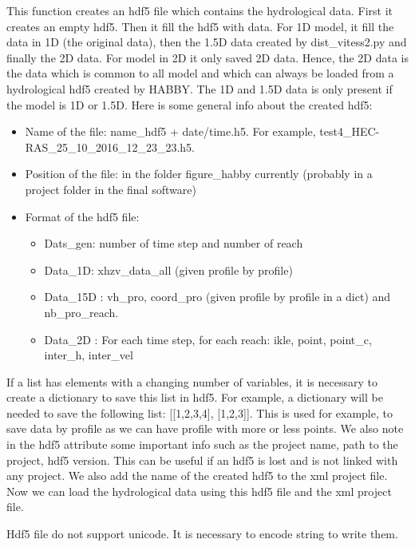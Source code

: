 \documentclass[letterpaper,10pt,english]{sphinxmanual}
\begin{document}
\begin{fulllineitems}
This function creates an hdf5 file which contains the hydrological data. First it creates an empty hdf5.
Then it fill the hdf5 with data. For 1D model, it fill the data in 1D (the original data), then the 1.5D data
created by dist\_vitess2.py and finally the 2D data. For model in 2D it only saved 2D data. Hence, the 2D data
is the data which is common to all model and which can always be loaded from a hydrological hdf5 created by
HABBY. The 1D and 1.5D data is only present if the model is 1D or 1.5D. Here is some general info about the
created hdf5:
\begin{itemize}
\item {} 
Name of the file: name\_hdf5  + date/time.h5.  For example, test4\_HEC-RAS\_25\_10\_2016\_12\_23\_23.h5.

\item {} 
Position of the file: in the folder  figure\_habby currently (probably in a project folder in the final software)

\item {} 
Format of the hdf5 file:
\begin{itemize}
\item {} 
Dats\_gen:  number of time step and number of reach

\item {} 
Data\_1D:  xhzv\_data\_all (given profile by profile)

\item {} 
Data\_15D :  vh\_pro, coord\_pro (given profile by profile in a dict) and nb\_pro\_reach.

\item {} 
Data\_2D : For each time step, for each reach: ikle, point, point\_c, inter\_h, inter\_vel

\end{itemize}

\end{itemize}

If a list has elements with a changing number of variables, it is necessary to create a dictionary to save
this list in hdf5. For example, a dictionary will be needed to save the following list: {[}{[}1,2,3,4{]}, {[}1,2,3{]}{]}.
This is used for example, to save data by profile as we can have profile with more or less points. We also note
in the hdf5 attribute some important info such as the project name, path to the project, hdf5 version.
This can be useful if an hdf5 is lost and is not linked with any project. We also add the name of the created
hdf5 to the xml project file. Now we can load the hydrological data using this hdf5 file and the xml project file.

Hdf5 file do not support unicode. It is necessary to encode string to write them.

\end{fulllineitems}
\end{document}
